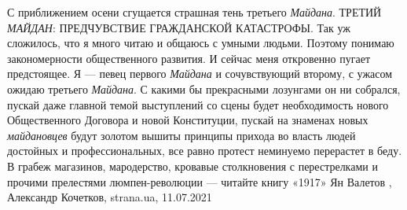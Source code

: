 С приближением осени сгущается страшная тень третьего \emph{Майдана}. ТРЕТИЙ \emph{МАЙДАН}:
ПРЕДЧУВСТВИЕ ГРАЖДАНСКОЙ КАТАСТРОФЫ.  Так уж сложилось, что я много читаю и
общаюсь с умными людьми. Поэтому понимаю закономерности общественного развития.
И сейчас меня откровенно пугает предстоящее. Я — певец первого \emph{Майдана} и
сочувствующий второму, с ужасом ожидаю третьего \emph{Майдана}.  С какими бы
прекрасными лозунгами он ни собрался, пускай даже главной темой выступлений со
сцены будет необходимость нового Общественного Договора и новой Конституции,
пускай на знаменах новых \emph{майдановцев} будут золотом вышиты принципы прихода во
власть людей достойных и профессиональных, все равно протест неминуемо
перерастет в беду. В грабеж магазинов, мародерство, кровавые столкновения с
перестрелками и прочими прелестями люмпен-революции — читайте книгу «1917» Ян
Валетов
, 
Александр Кочетков, strana.ua, 11.07.2021

